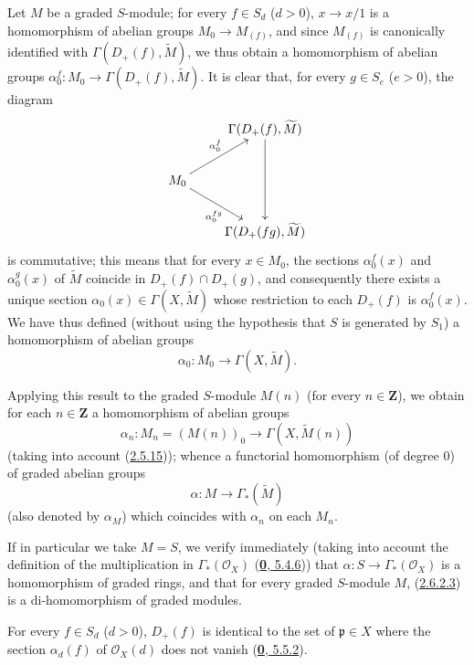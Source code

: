 \begin{env}[2.6.2]
\label{II.2.6.2}
Let $M$ be a graded $S$-module; for every $f\in S_d$ ($d>0$),
$x\to x/1$ is a homomorphism of abelian groups
$M_0\to M_{(f)}$, and since $M_{(f)}$ is canonically
identified with $\Gamma(D_+(f),\widetilde{M})$, we thus obtain a
homomorphism of abelian groups $\alpha_0^f:M_0\to\Gamma(D_+(f),\widetilde{M})$.
It is clear that, for every $g\in S_e$ ($e>0$), the diagram
\[
  \xymatrix{
    & \Gamma(D_+(f),\widetilde{M})\ar[dd]\\
    M_0\ar[ur]^{\alpha_0^f}\ar[dr]_{\alpha_0^{fg}}\\
    & \Gamma(D_+(fg),\widetilde{M})
  }
\]
is commutative; this means that for every $x\in M_0$, the sections
$\alpha_0^f(x)$ and $\alpha_0^g(x)$ of $\widetilde{M}$ coincide in
$D_+(f)\cap D_+(g)$, and consequently there exists a unique section
$\alpha_0(x)\in\Gamma(X,\widetilde{M})$ whose restriction to each
$D_+(f)$ is $\alpha_0^f(x)$. We have thus defined (without using the
hypothesis that $S$ is generated by $S_1$) a homomorphism of abelian groups
\[
\label{II.2.6.2.1}
  \alpha_0:M_0\longrightarrow\Gamma(X,\widetilde{M}).
\tag{2.6.2.1}
\]

Applying this result to the graded $S$-module $M(n)$ (for every
$n\in\mathbf{Z}$), we obtain for each $n\in\mathbf{Z}$ a homomorphism
of abelian groups
\[
\label{II.2.6.2.2}
  \alpha_n:M_n=(M(n))_0\longrightarrow\Gamma(X,\widetilde{M}(n))
\tag{2.6.2.2}
\]
(taking into account (\hyperref[II.2.5.15]{2.5.15})); whence a
functorial homomorphism (of degree $0$) of graded abelian groups
\[
\label{II.2.6.2.3}
  \alpha:M\longrightarrow\Gamma_*(\widetilde{M})
\tag{2.6.2.3}
\]
(also denoted by $\alpha_M$) which coincides with $\alpha_n$ on each $M_n$.

If in particular we take $M=S$, we verify immediately (taking into account
the definition of the multiplication in $\Gamma_*(\mathcal{O}_X)$
(\hyperref[0.5.4.6]{\textbf{0}, 5.4.6})) that
$\alpha:S\to\Gamma_*(\mathcal{O}_X)$ is a homomorphism of graded
rings, and that for every graded $S$-module $M$,
(\hyperref[II.2.6.2.3]{2.6.2.3}) is a di-homomorphism of graded
modules.
\end{env}

\begin{proposition}[2.6.3]
\label{II.2.6.3}
For every $f\in S_d$ ($d>0$), $D_+(f)$ is identical to the set of
$\mathfrak{p}\in X$ where the section $\alpha_d(f)$ of $\mathcal{O}_X(d)$
does not vanish \textup{(\hyperref[0.5.5.2]{\textbf{0}, 5.5.2})}.
\end{proposition}

